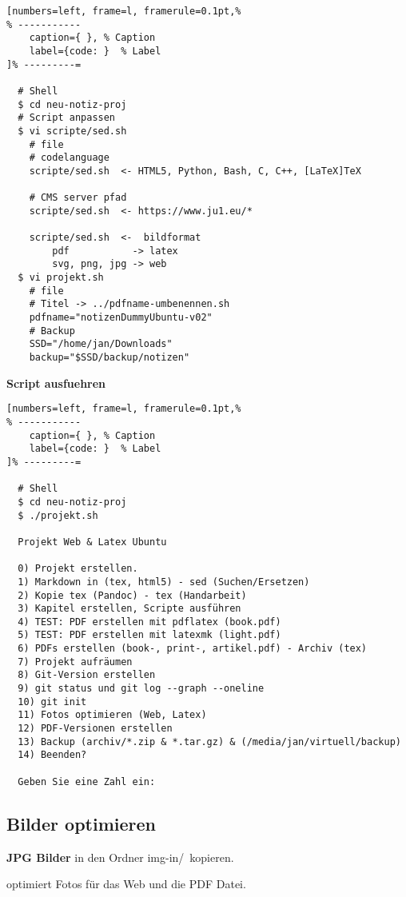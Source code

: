 \lstset{language=Bash} %
\begin{lstlisting}[numbers=left, frame=l, framerule=0.1pt,%
% -----------
	caption={ }, % Caption
	label={code: }  % Label
]% ---------=

  # Shell
  $ cd neu-notiz-proj
  # Script anpassen
  $ vi scripte/sed.sh
    # file
    # codelanguage
    scripte/sed.sh  <- HTML5, Python, Bash, C, C++, [LaTeX]TeX

    # CMS server pfad
    scripte/sed.sh  <- https://www.ju1.eu/*

    scripte/sed.sh  <-  bildformat
        pdf           -> latex
        svg, png, jpg -> web
  $ vi projekt.sh
    # file
    # Titel -> ../pdfname-umbenennen.sh
    pdfname="notizenDummyUbuntu-v02"
    # Backup
    SSD="/home/jan/Downloads"
    backup="$SSD/backup/notizen"
\end{lstlisting}

\textbf{Script ausfuehren}

\lstset{language=Bash} %
\begin{lstlisting}[numbers=left, frame=l, framerule=0.1pt,%
% -----------
	caption={ }, % Caption
	label={code: }  % Label
]% ---------=

  # Shell
  $ cd neu-notiz-proj
  $ ./projekt.sh

  Projekt Web & Latex Ubuntu

  0) Projekt erstellen.
  1) Markdown in (tex, html5) - sed (Suchen/Ersetzen)
  2) Kopie tex (Pandoc) - tex (Handarbeit)
  3) Kapitel erstellen, Scripte ausführen
  4) TEST: PDF erstellen mit pdflatex (book.pdf)
  5) TEST: PDF erstellen mit latexmk (light.pdf)
  6) PDFs erstellen (book-, print-, artikel.pdf) - Archiv (tex)
  7) Projekt aufräumen
  8) Git-Version erstellen
  9) git status und git log --graph --oneline
  10) git init
  11) Fotos optimieren (Web, Latex)
  12) PDF-Versionen erstellen
  13) Backup (archiv/*.zip & *.tar.gz) & (/media/jan/virtuell/backup)
  14) Beenden?

  Geben Sie eine Zahl ein:
\end{lstlisting}

\subsection{Bilder optimieren}\label{bilder-optimieren}

\textbf{JPG Bilder} in den Ordner \frqq img-in/\flqq\ kopieren.

optimiert Fotos für das Web und die PDF Datei.

